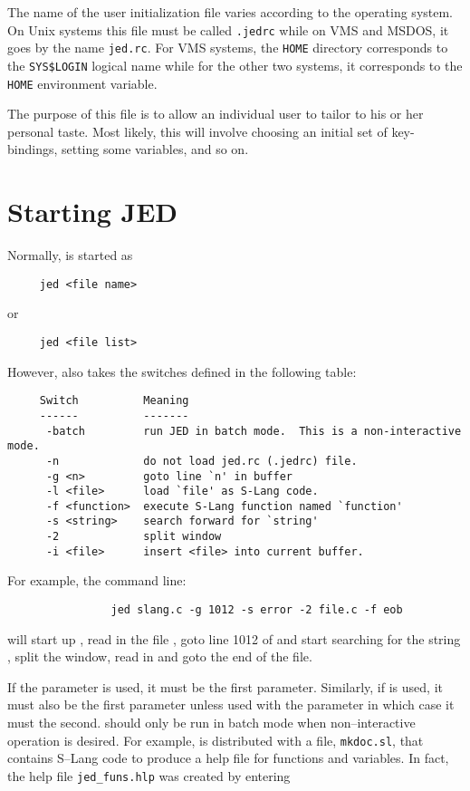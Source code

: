   The name of the user initialization file varies according to the operating
  system.  On Unix systems this file must be called \verb|.jedrc| while on
  VMS and MSDOS, it goes by the name \verb|jed.rc|.  For VMS systems, the
  \verb|HOME| directory corresponds to the \verb|SYS$LOGIN| %
  logical name while for the other two systems, it corresponds to the
  \verb|HOME| environment variable.

  The purpose of this file is to allow an individual user to tailor \jed{} to
  his or her personal taste.  Most likely, this will involve choosing an
  initial set of key-bindings, setting some variables, and so on.

\section{Starting JED}

  Normally, \jed{} is started as

\begin{verbatim}
     jed <file name>
\end{verbatim}
  or 
\begin{verbatim}
     jed <file list>
\end{verbatim}

  However, \jed{} also takes the switches defined in the following table:
\begin{verbatim}
     Switch          Meaning
     ------          -------
      -batch         run JED in batch mode.  This is a non-interactive mode.
      -n             do not load jed.rc (.jedrc) file.
      -g <n>         goto line `n' in buffer
      -l <file>      load `file' as S-Lang code.
      -f <function>  execute S-Lang function named `function'
      -s <string>    search forward for `string'
      -2             split window
      -i <file>      insert <file> into current buffer.
\end{verbatim} 

  For example, the command line:
\begin{verbatim}
                jed slang.c -g 1012 -s error -2 file.c -f eob
\end{verbatim}


  will start up \jed{}, read in the file , goto line 1012 of
   and start searching for the string , split the
  window, read in  and goto the end of the file.

  If the  parameter is used, it must be the first parameter.
  Similarly, if  is used, it must also be the first parameter unless
  used with the  parameter in which case it must the second.
  \jed{} should only be run in batch mode when non--interactive operation is
  desired. For example, \jed{} is distributed with a file, \verb|mkdoc.sl|,
  that contains S--Lang code to produce a help file for functions and
  variables.  In fact, the help file \verb|jed_funs.hlp| was created by
  entering

